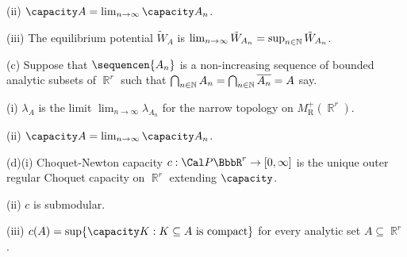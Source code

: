 \quad(ii) $\capacity A=\lim_{n\to\infty}\capacity A_n$.

\quad(iii) The equilibrium potential
$\tilde W_A$ is
$\lim_{n\to\infty}\tilde W_{A_n}=\sup_{n\in\Bbb N}\tilde W_{A_n}$.

(c) Suppose that $\sequencen{A_n}$ is a non-increasing sequence of bounded
analytic subsets of $\BbbR^r$ such that
$\bigcap_{n\in\Bbb N}A_n=\bigcap_{n\in\Bbb N}\overline{A_n}=A$ say.

\quad(i) $\lambda_A$ is the limit
$\lim_{n\to\infty}\lambda_{A_n}$ for the narrow topology on
$M^+_{\text{R}}(\BbbR^r)$.

\quad(ii) $\capacity A=\lim_{n\to\infty}\capacity A_n$.

(d)(i) Choquet-Newton capacity $c:\Cal P\BbbR^r\to[0,\infty]$ is the unique
outer regular Choquet capacity on $\BbbR^r$ extending $\capacity$.

\quad(ii) $c$ is submodular.

\quad(iii) $c(A)=\sup\{\capacity K:K\subseteq A\text{ is compact}\}$
for every analytic set $A\subseteq\BbbR^r$.


